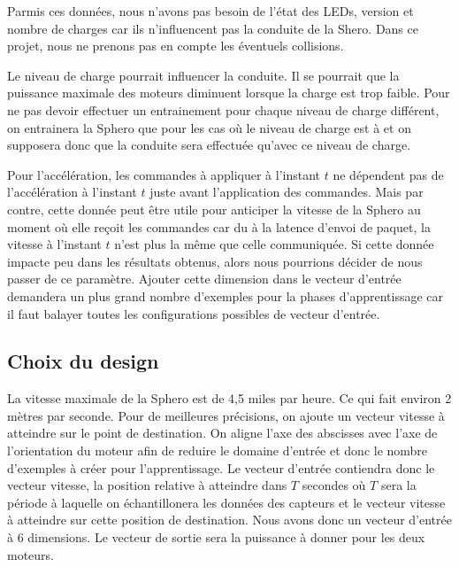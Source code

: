 \documentclass[12pt,a4paper,oneside, titlepage]{article}
\begin{document}
Parmis ces données, nous n'avons pas besoin de l'état des LEDs, version et nombre de charges car ils n'influencent pas la conduite de la Shero.
Dans ce projet, nous ne prenons pas en compte les éventuels collisions.

Le niveau de charge pourrait influencer la conduite.
Il se pourrait que la puissance maximale des moteurs diminuent lorsque la charge est trop faible.
Pour ne pas devoir effectuer un entrainement pour chaque niveau de charge différent, on entrainera la Sphero que pour les cas où le niveau de charge est à  et on supposera donc que la conduite sera effectuée qu'avec ce niveau de charge.

Pour l'accélération, les commandes à appliquer à l'instant $t$ ne dépendent pas de l'accélération à l'instant $t$ juste avant l'application des commandes.
Mais par contre, cette donnée peut être utile pour anticiper la vitesse de la Sphero au moment où elle reçoit les commandes car du à la latence d'envoi de paquet, la vitesse à l'instant $t$ n'est plus la même que celle communiquée.
Si cette donnée impacte peu dans les résultats obtenus, alors nous pourrions décider de nous passer de ce paramètre.
Ajouter cette dimension dans le vecteur d'entrée demandera un plus grand nombre d'exemples pour la phases d'apprentissage car il faut balayer toutes les configurations possibles de vecteur d'entrée.

\subsection{Choix du design}

La vitesse maximale de la Sphero est de 4,5 miles par heure\cite{product}.
Ce qui fait environ 2 mètres par seconde.
Pour de meilleures précisions, on ajoute un vecteur vitesse à atteindre sur le point de destination.
On aligne l'axe des abscisses avec l'axe de l'orientation du moteur afin de reduire le domaine d'entrée et donc le nombre d'exemples à créer pour l'apprentissage.
Le vecteur d'entrée contiendra donc le vecteur vitesse, la position relative à atteindre dans $T$ secondes où $T$ sera la période à laquelle on échantillonera les données des capteurs et le vecteur vitesse à atteindre sur cette position de destination.
Nous avons donc un vecteur d'entrée à 6 dimensions.
Le vecteur de sortie sera la puissance à donner pour les deux moteurs.
\end{document}
